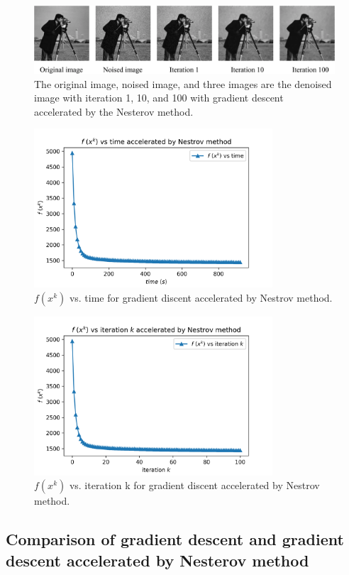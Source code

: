\documentclass{article}
\begin{document}
\begin{figure}[h]
  \includegraphics[width=5in]{pic11.png}
  \centering
  \caption{The original image, noised image, and three images are the denoised image with iteration 1, 10, and 100 with gradient descent accelerated by the Nesterov method.}
  \label{img11}
\end{figure}

\begin{figure}[h]
  \includegraphics[width=3.5in]{pic12.png}
  \centering
  \caption{$f(x^{k})$ vs. time for gradient discent accelerated by Nestrov method.}
  \label{img12}
\end{figure}

\begin{figure}[h]
  \includegraphics[width=3.5in]{pic13.png}
  \centering
  \caption{$f(x^{k})$ vs. iteration k for gradient discent accelerated by Nestrov method.}
  \label{img13}
\end{figure}



\subsection{Comparison of gradient descent and gradient descent accelerated by Nesterov method}
\end{document}
